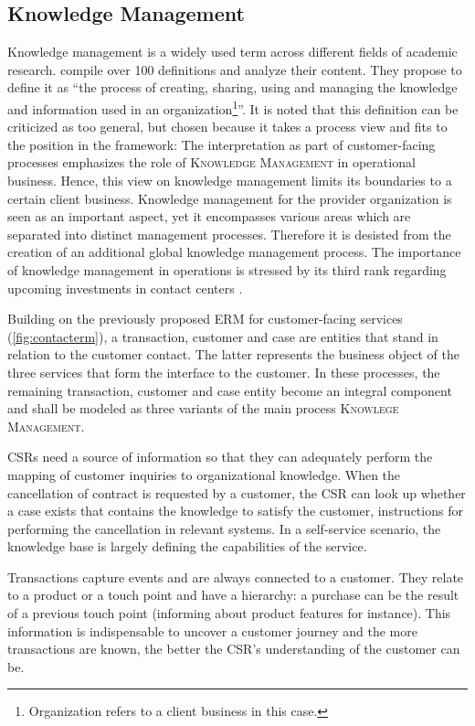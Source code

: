 	 
	 \subsection{Knowledge Management}
	 \label{pr:kno}

Knowledge management is a widely used term across different fields of academic research. \cite{girard2015defining} compile over 100 definitions and analyze their content. They propose to define it as \enquote{the process of creating, sharing, using and managing the knowledge and information used in an organization\footnote{Organization refers to a client business in this case.}}\citep[]{girard2015defining}. It is noted that this definition can be criticized as too general, but chosen because it takes a process view and fits to the position in the framework: The interpretation as part of customer-facing processes emphasizes the role of \textsc{Knowledge Management} in operational business. Hence, this view on knowledge management limits its boundaries to a certain client business. Knowledge management for the provider organization is seen as an important aspect, yet it encompasses various areas which are separated into distinct management processes. Therefore it is desisted from the creation of an additional global knowledge management process. The importance of knowledge management in operations is stressed by its third rank regarding upcoming investments in contact centers \citep{ccnet2016}. 

Building on the previously proposed \acrshort{ERM} for customer-facing services (\Fig \ref{fig:contacterm}), a transaction, customer and case are entities that stand in relation to the customer contact. The latter represents the business object of the three services that form the interface to the customer. In these processes, the remaining transaction, customer and case entity become an integral component and shall be modeled as three variants of the main process \textsc{Knowlege Management}.

\acrshort{CSR}s need a source of information so that they can adequately perform the mapping of customer inquiries to organizational knowledge. When the cancellation of contract is requested by a customer, the \acrshort{CSR} can look up whether a case exists that contains the knowledge to satisfy the customer, \viz instructions for performing the cancellation in relevant systems. In a self-service scenario, the knowledge base is largely defining the capabilities of the service. 

Transactions capture events and are always connected to a customer. They relate to a product or a touch point and have a hierarchy: a purchase can be the result of a previous touch point (informing about product features for instance). This information is 	indispensable to uncover a customer journey and the more transactions are known, the better the \acrshort{CSR}'s understanding of the customer can be. 

